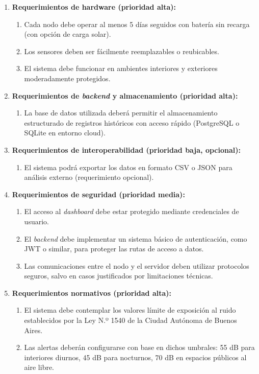 \documentclass[
11pt, %
]{charter}
\begin{document}
\begin{enumerate}
    \item \textbf{Requerimientos de hardware (prioridad alta):}
    \begin{enumerate}
        \item Cada nodo debe operar al menos 5 días seguidos con batería sin recarga (con opción de carga solar).
        \item Los sensores deben ser fácilmente reemplazables o reubicables.
        \item El sistema debe funcionar en ambientes interiores y exteriores moderadamente protegidos.
    \end{enumerate}

    \item \textbf{Requerimientos de \textit{backend} y almacenamiento (prioridad alta):}
    \begin{enumerate}
        \item La base de datos utilizada deberá permitir el almacenamiento estructurado de registros históricos con acceso rápido (PostgreSQL o SQLite en entorno cloud).
    \end{enumerate}

    \item \textbf{Requerimientos de interoperabilidad (prioridad baja, opcional):}
    \begin{enumerate}
        \item El sistema podrá exportar los datos en formato CSV o JSON para análisis externo (requerimiento opcional).
    \end{enumerate}

    \item \textbf{Requerimientos de seguridad (prioridad media):}
    \begin{enumerate}
        \item El acceso al \textit{dashboard} debe estar protegido mediante credenciales de usuario.
        \item El \textit{backend} debe implementar un sistema básico de autenticación, como JWT o similar, para proteger las rutas de acceso a datos.
        \item Las comunicaciones entre el nodo y el servidor deben utilizar protocolos seguros, salvo en casos justificados por limitaciones técnicas.
    \end{enumerate}

    \item \textbf{Requerimientos normativos (prioridad alta):}
    \begin{enumerate}
        \item El sistema debe contemplar los valores límite de exposición al ruido establecidos por la Ley N.º 1540 de la Ciudad Autónoma de Buenos Aires.
        \item Las alertas deberán configurarse con base en dichos umbrales: 55 dB para interiores diurnos, 45 dB para nocturnos, 70 dB en espacios públicos al aire libre.
    \end{enumerate}
\end{enumerate}
\end{document}
